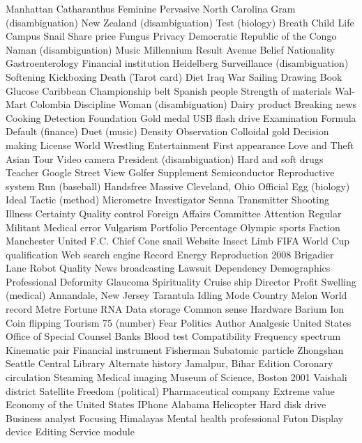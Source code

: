 Manhattan  Catharanthus  Feminine  
Pervasive  North Carolina  Gram (disambiguation)  
New Zealand (disambiguation)  Test (biology)  Breath  
Child  Life  Campus  
Snail  Share price  Fungus  
Privacy  Democratic Republic of the Congo  Naman (disambiguation)  
Music Millennium  Result  Avenue  
Belief  Nationality  Gastroenterology  
Financial institution  Heidelberg  Surveillance (disambiguation)  
Softening  Kickboxing  Death (Tarot card)  
Diet  Iraq War  Sailing  
Drawing  Book  Glucose  
Caribbean  Championship belt  Spanish people  
Strength of materials  Wal-Mart  Colombia  
Discipline  Woman (disambiguation)  Dairy product  
Breaking news  Cooking  Detection  
Foundation  Gold medal  USB flash drive  
Examination  Formula  Default (finance)  
Duet (music)  Density  Observation  
Colloidal gold  Decision making  License  
World Wrestling Entertainment  First appearance  Love and Theft  
Asian Tour  Video camera  President (disambiguation)  
Hard and soft drugs  Teacher  Google Street View  
Golfer  Supplement  Semiconductor  
Reproductive system  Run (baseball)  Handsfree  
Massive  Cleveland, Ohio  Official  
Egg (biology)  Ideal  Tactic (method)  
Micrometre  Investigator  Senna  
Transmitter  Shooting  Illness  
Certainty  Quality control  Foreign Affairs Committee  
Attention  Regular  Militant  
Medical error  Vulgarism  Portfolio  
Percentage  Olympic sports  Faction  
Manchester United F.C.  Chief  Cone snail  
Website  Insect  Limb  
FIFA World Cup qualification  Web search engine  Record  
Energy  Reproduction  2008  
Brigadier  Lane  Robot  
Quality  News broadcasting  Lawsuit  
Dependency  Demographics  Professional  
Deformity  Glaucoma  Spirituality  
Cruise ship  Director  Profit  
Swelling (medical)  Annandale, New Jersey  Tarantula  
Idling  Mode  Country  
Melon  World record  Metre  
Fortune  RNA  Data storage  
Common sense  Hardware  Barium  
Ion  Coin flipping  Tourism  
75 (number)  Fear  Politics  
Author  Analgesic  United States Office of Special Counsel  
Banks  Blood test  Compatibility  
Frequency spectrum  Kinematic pair  Financial instrument  
Fisherman  Subatomic particle  Zhongshan  
Seattle Central Library  Alternate history  Jamalpur, Bihar  
Edition  Coronary circulation  Steaming  
Medical imaging  Museum of Science, Boston  2001  
Vaishali district  Satellite  Freedom (political)  
Pharmaceutical company  Extreme value  Economy of the United States  
IPhone  Alabama  Helicopter  
Hard disk drive  Business analyst  Focusing  
Himalayas  Mental health professional  Futon  
Display device  Editing  Service module  

